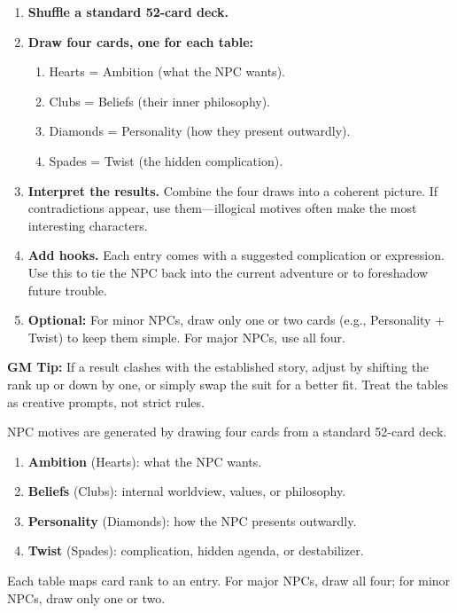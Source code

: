 \documentclass[12pt]{article}
\begin{document}
\begin{enumerate}
  \item \textbf{Shuffle a standard 52-card deck.}
  \item \textbf{Draw four cards, one for each table:}
    \begin{enumerate}
      \item Hearts = Ambition (what the NPC wants).
      \item Clubs = Beliefs (their inner philosophy).
      \item Diamonds = Personality (how they present outwardly).
      \item Spades = Twist (the hidden complication).
    \end{enumerate}
  \item \textbf{Interpret the results.} Combine the four draws into a coherent picture. If contradictions appear, use them—illogical motives often make the most interesting characters.
  \item \textbf{Add hooks.} Each entry comes with a suggested complication or expression. Use this to tie the NPC back into the current adventure or to foreshadow future trouble.
  \item \textbf{Optional:} For minor NPCs, draw only one or two cards (e.g., Personality + Twist) to keep them simple. For major NPCs, use all four.
\end{enumerate}

\noindent \textbf{GM Tip:} If a result clashes with the established story, adjust by shifting the rank up or down by one, or simply swap the suit for a better fit. Treat the tables as creative prompts, not strict rules.

\noindent NPC motives are generated by drawing four cards from a standard 52-card deck.  
\begin{enumerate}
  \item \textbf{Ambition} (Hearts): what the NPC wants.  
  \item \textbf{Beliefs} (Clubs): internal worldview, values, or philosophy.  
  \item \textbf{Personality} (Diamonds): how the NPC presents outwardly.  
  \item \textbf{Twist} (Spades): complication, hidden agenda, or destabilizer.  
\end{enumerate}

Each table maps card rank to an entry. For major NPCs, draw all four; for minor NPCs, draw only one or two.
\end{document}
